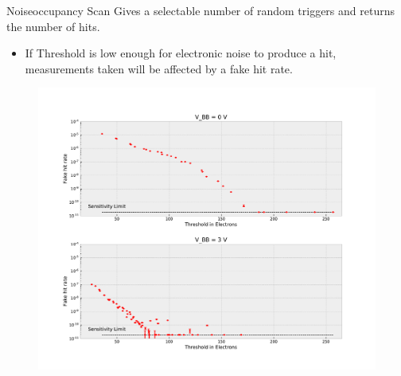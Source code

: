 \documentclass{beamer}
\begin{document}
\begin{frame}{Noiseoccupancy Scan}
    Gives a selectable number of random triggers and returns the number of hits.
    \begin{itemize}
	\item If Threshold is low enough for electronic noise to produce a hit,
	    measurements taken will be affected by a fake hit rate.
    \end{itemize}
    \begin{figure}[H]
	\centering
	\includegraphics[trim=0 50 0 380, clip, width=\textwidth]{Fake_Hit_Rate.pdf}
    \end{figure}
\end{frame}

\end{document}
